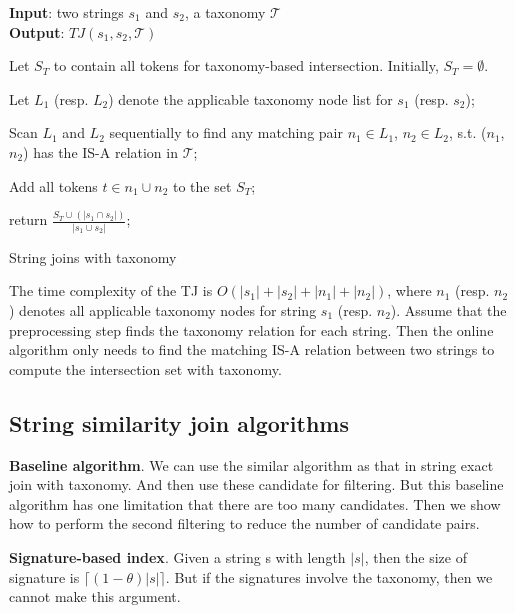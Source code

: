 \begin{algorithm}
{\bf Input}: two strings $s_1$ and $s_2$, a taxonomy $\mathcal{T}$ \\
{\bf Output}: $TJ(s_1,s_2,\mathcal{T})$
\begin{compactenum}[(1)]
\item Let $S_T $ to contain all tokens for taxonomy-based intersection. Initially, $S_T = \emptyset$.
\item Let $L_1$ (resp. $L_2$) denote the applicable taxonomy node list for $s_1$ (resp. $s_2$);
\item Scan $L_1$ and $L_2$ sequentially to find any matching pair $n_1 \in L_1$, $n_2 \in L_2$, s.t. ($n_1$,$n_2$) has the IS-A relation in $\mathcal{T}$;
\item Add all tokens $t \in n_1 \cup n_2$ to the set $S_T$;
\item  return $\frac{S_T \cup (|s_1 \cap s_2|)}{|s_1 \cup s_2|}$;
\end{compactenum}
\caption{String joins with taxonomy}
\label{alg:exactjoin}
\end{algorithm}

The time complexity of the TJ is $O(|s_1|+|s_2|+|n_1|+|n_2|)$, where $n_1$ (resp. $n_2$) denotes all applicable taxonomy nodes for string $s_1$  (resp. $n_2$). Assume that the preprocessing step finds the taxonomy relation for each string. Then the online algorithm only needs to find the matching IS-A relation between two strings to compute the intersection set with taxonomy.

\subsection{String similarity join algorithms}





\textbf{Baseline algorithm}. We can use the similar algorithm as that in string exact join with taxonomy. And then use these candidate for filtering. But this baseline algorithm has one limitation that there are too many candidates. Then we show how to perform the second filtering to reduce the number of candidate pairs.

\textbf{Signature-based index}. Given a string s with length $|s|$, then the size of signature is $\lceil (1-\theta)|s| \rceil$. But if the signatures involve the taxonomy, then we cannot make this argument.

